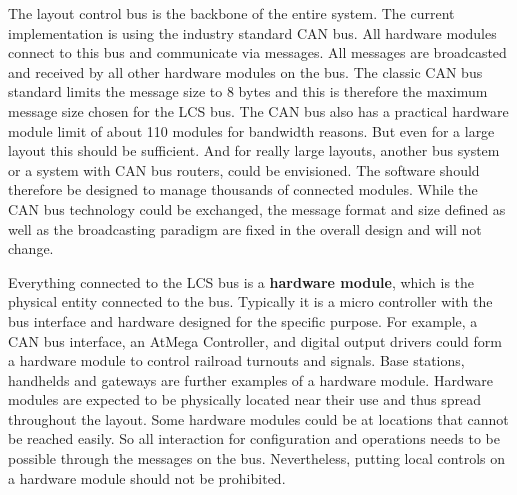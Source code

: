 \begin{center}
\end{center}


The layout control bus is the backbone of the entire system. The current implementation is using the industry standard CAN bus. All hardware modules connect to this bus and communicate via messages. All messages are broadcasted and received by all other hardware modules on the bus. The classic CAN bus standard limits the message size to 8 bytes and this is therefore the maximum message size chosen for the LCS bus. The CAN bus also has a practical hardware module limit of about 110 modules for bandwidth reasons. But even for a large layout this should be sufficient. And for really large layouts, another bus system or a system with CAN bus routers, could be envisioned. The software should therefore be designed to manage thousands of connected modules. While the CAN bus technology could be exchanged, the message format and size defined as well as the broadcasting paradigm are fixed in the overall design and will not change.


Everything connected to the LCS bus is a {\bf hardware module}, which is the physical entity connected to the bus. Typically it is a micro controller with the bus interface and hardware designed for the specific purpose. For example, a CAN bus interface, an AtMega Controller, and digital output drivers could form a hardware module to control railroad turnouts and signals. Base stations, handhelds and gateways are further examples of a hardware module. Hardware modules are expected to be physically located near their use and thus spread throughout the layout. Some hardware modules could be at locations that cannot be reached easily. So all interaction for configuration and operations needs to be possible through the messages on the bus. Nevertheless, putting local controls on a hardware module should not be prohibited.

